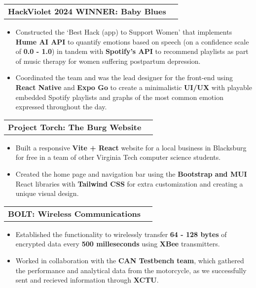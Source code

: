 \documentclass[letterpaper, 10pt]{article}
\makeatletter
\newcommand{\resumeItem}[1]{
  \item\small{
    {#1 \vspace{-2pt}}
  }
}
\newcommand{\resumeProjectHeading}[2]{
    \vspace{-2pt}\item
    \begin{tabular*}{0.97\textwidth}{l@{\extracolsep{\fill}}r}
      \small#1 & #2 \\
    \end{tabular*}\vspace{-7pt}
}
\newcommand{\resumeItemListStart}{\begin{itemize}}
\newcommand{\resumeItemListEnd}{\end{itemize}\vspace{-5pt}}
\makeatother
\begin{document}
	\resumeProjectHeading
	{\textbf{HackViolet 2024 WINNER: Baby Blues}}{}
	  \resumeItemListStart
		\resumeItem{Constructed the `Best Hack (app) to Support Women' that implements \textbf{Hume AI API} to quantify emotions based on speech (on a confidence scale of \textbf{0.0 - 1.0}) in tandem with \textbf{Spotify's API} to recommend playlists as part of music therapy for women suffering postpartum depression.}
		\resumeItem{Coordinated the team and was the lead designer for the front-end using \textbf{React Native} and \textbf{Expo Go} to create a minimalistic \textbf{UI/UX} with playable embedded Spotify playlists and graphs of the most common emotion expressed throughout the day.}
	 \resumeItemListEnd

	\resumeProjectHeading
	{\textbf{Project Torch: The Burg Website}}{}
	  \resumeItemListStart
		\resumeItem{Built a responsive \textbf{Vite + React} website for a local business in Blacksburg for free in a team of other Virginia Tech computer science students.}
		\resumeItem{Created the home page and navigation bar using the \textbf{Bootstrap and MUI} React libraries with \textbf{Tailwind CSS} for extra customization and creating a unique visual design.}
	 \resumeItemListEnd


	\resumeProjectHeading
         {\textbf{BOLT: Wireless Communications}}{}
          \resumeItemListStart
	    \resumeItem{Established the functionality to wirelessly transfer \textbf{64 - 128 bytes} of encrypted data every \textbf{500 milleseconds} using \textbf{XBee} transmitters.}
	    \resumeItem{Worked in collaboration with the \textbf{CAN Testbench team}, which gathered the performance and analytical data from the motorcycle, as we successfully sent and recieved information through \textbf{XCTU}.}
          \resumeItemListEnd
      
\end{document}
